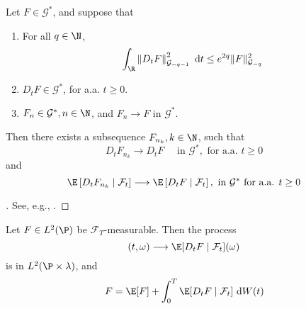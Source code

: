 \begin{lemma}\label{lm:conv-co}
Let $F \in \mathcal{G}^*$, and suppose that

\begin{enumerate}
  \item For all $q \in \N$, 
$$
\int_{\R}\left\|D_t F\right\|_{\mathcal{G}_{-q-1}}^2 ~\mathrm{d} t \leq e^{2 q}\|F\|_{\mathcal{G}_{-q}}^2
$$

\item $D_t F \in \mathcal{G}^*$, for a.a. $t \geq 0$.

\item $F_n \in \mathcal{G}^*, n \in \N$, and $F_n \longrightarrow F$ in $\mathcal{G}^*$.
\end{enumerate}

Then there exists a subsequence $F_{n_k}, k \in \N$, such that
$$
D_t F_{n_k} \longrightarrow D_t F \quad \text { in } \mathcal{G}^*, \text { for a.a. } t \geq 0
$$
and
$$
\E \left[D_t F_{n_k} \mid \mathcal{F}_t\right] \longrightarrow \E \left[D_t F \mid \mathcal{F}_t\right], \text { in } \mathcal{G}^* \text { for a.a. } t \geq 0
$$
\end{lemma}

\begin{proof}[]
  See, e.g., \cite{holden1996stochastic}. 
\end{proof}

\begin{theorem}
  Let $F \in L^2(\P)$ be $\mathcal{F}_T$-measurable. Then the process 
  \[
    (t,\omega) \longrightarrow \E [D_t F \mid \mathcal{F}_t](\omega)
  \]
  is in $L^2(\P \times \lambda)$, and
  \[
    F = \E[F] + \int_0^T \E [D_t F \mid \mathcal{F}_t] ~\mathrm{d}W(t)
  \]
\end{theorem}

